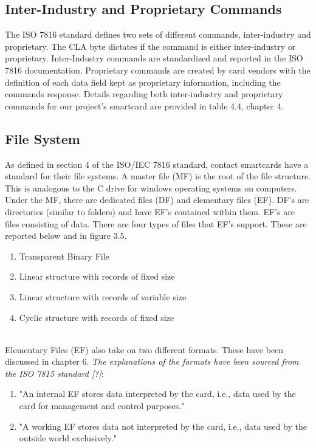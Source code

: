 \documentclass[bsc,frontabs,twoside,singlespacing,parskip,deptreport]{infthesis}     %
\begin{document}
\pagebreak

\subsection{Inter-Industry and Proprietary Commands}
The ISO 7816 standard defines two sets of different commands, inter-industry and proprietary. The CLA byte dictates if the command is either inter-industry or proprietary. Inter-Industry commands are standardized and reported in the ISO 7816 documentation. Proprietary commands are created by card vendors with the definition of each data field kept as proprietary information, including the commands response. Details regarding both inter-industry and proprietary commands for our project's smartcard are provided in table 4.4, chapter 4.

\subsection{File System}

As defined in section 4 of the ISO/IEC 7816 standard, contact smartcards have a standard for their file systems. A master file (MF) is the root of the file structure. This is analogous to the C drive for windows operating systems on computers. Under the MF, there are dedicated files (DF) and elementary files (EF). DF's are directories (similar to folders) and have EF's contained within them. EF's are files consisting of data. There are four types of files that EF's support. These are reported below and in figure 3.5.
\begin{enumerate}
\item Transparent Binary File
\item Linear structure with records of fixed size
\item Linear structure with records of variable size
\item Cyclic structure with records of fixed size\\\\
\end{enumerate}

Elementary Files (EF) also take on two different formats. These have been discussed in chapter 6. \textit{The explanations of the formats have been sourced from the ISO 7815 standard [?]}:
\begin{enumerate}
\item "An internal EF stores data interpreted by the card, i.e., data used by the card for management and
control purposes."
\item "A working EF stores data not interpreted by the card, i.e., data used by the outside world exclusively."
\end{enumerate}
\end{document}

